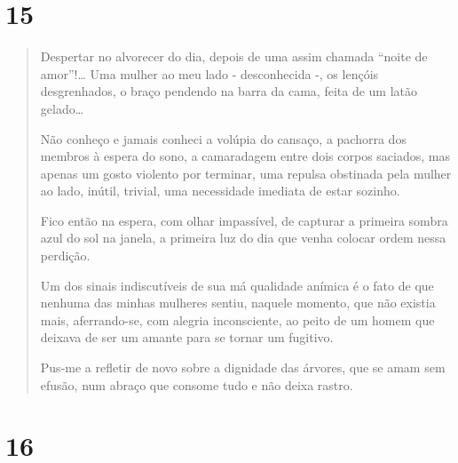 \section{15}\label{section-14}

\begin{quote}
Despertar no alvorecer do dia, depois de uma assim chamada ``noite de
amor''!\ldots{} Uma mulher ao meu lado - desconhecida -, os lençóis
desgrenhados, o braço pendendo na barra da cama, feita de um latão
gelado\ldots{}

Não conheço e jamais conheci a volúpia do cansaço, a pachorra dos
membros à espera do sono, a camaradagem entre dois corpos saciados, mas
apenas um gosto violento por terminar, uma repulsa obstinada pela mulher
ao lado, inútil, trivial, uma necessidade imediata de estar sozinho.

Fico então na espera, com olhar impassível, de capturar a primeira
sombra azul do sol na janela, a primeira luz do dia que venha colocar
ordem nessa perdição.

Um dos sinais indiscutíveis de sua má qualidade anímica é o fato de que
nenhuma das minhas mulheres sentiu, naquele momento, que não existia
mais, aferrando-se, com alegria inconsciente, ao peito de um homem que
deixava de ser um amante para se tornar um fugitivo.

Pus-me a refletir de novo sobre a dignidade das árvores, que se amam sem
efusão, num abraço que consome tudo e não deixa rastro.
\end{quote}

\section{16}\label{section-15}

